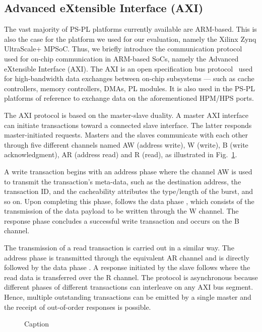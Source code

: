 \subsection{Advanced eXtensible Interface (AXI)}
\label{subsec:axi_transaction_scheme}
The vast majority of PS-PL platforms currently available are
ARM-based. This is also the case for the platform we used for our
evaluation, namely the Xilinx Zynq UltraScale+ MPSoC. Thus, we briefly
introduce the communication protocol used for on-chip communication in
ARM-based SoCs, namely the Advanced eXtensible Interface (AXI). The
AXI is an open specification bus protocol~\cite{ARM-AXI} used for
high-bandwidth data exchanges between on-chip subsystems --- such as
cache controllers, memory controllers, DMAs, PL modules. It is also
used in the PS-PL platforms of reference to exchange data on the
aforementioned HPM/HPS ports.

The AXI protocol is based on the master-slave duality. A master AXI
interface can initiate transactions toward a connected slave
interface.  The latter responds master-initiated
requests.  Masters and the slaves communicate with each other through
five different channels named AW (address write), W (write), B (write
acknowledgment), AR (address read) and R (read), as illustrated in
Fig.~\ref{fig:axi_transaction_scheme_figure}.

A write transaction begins with an address phase  where the
channel AW is used to transmit the transaction's meta-data, such
as the destination address, the transaction ID, and the cacheability
attributes the type/length of the burst, and so on.  Upon completing this phase, follows the data phase , which
consists of the transmission of the data payload to be written through
the W channel.  The response phase  concludes a successful write transaction and occurs on the B channel.

The transmission of a read transaction is carried out in a similar
way.  The address phase  is transmitted through the
equivalent AR channel and is directly followed by the data phase
.  A response initiated by the slave follows where the
read data is transferred over the R channel. The protocol is
asynchronous because different phases of different transactions can
interleave on any AXI bus segment. Hence, multiple outstanding
transactions can be emitted by a single master and the receipt of
out-of-order responses is possible.

\begin{figure}
  \centering
  
  \caption{Caption}
  \label{fig:axi_transaction_scheme_figure}
\end{figure}
